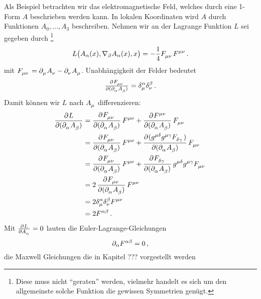 \begin{beispiel}
Als Beispiel betrachten wir das elektromagnetische Feld, welches durch eine
1-Form $A$ beschrieben werden kann. In lokalen Koordinaten wird $A$
durch Funktionen $A_0,\dots,A_3$ beschreiben. Nehmen wir an der Lagrange
Funktion $L$ sei gegeben durch \footnote{Diese muss nicht "`geraten"'
werden, vielmehr handelt es sich um den allgemeinste solche Funktion die
gewissen Symmetrien genügt. }
\begin{equation}
L\left(A_\alpha(x),\nabla_\beta
A_\alpha(x),x\right)=-\frac{1}{4}\tensor{F}{_\mu_\nu}\tensor{F}{^\mu^\nu}\,.
\end{equation}
mit
$\tensor{F}{_\mu_\nu}=\tensor{\partial}{_\mu}\tensor{A}{_\nu}-\tensor{\partial}{_\nu}\tensor{A}{_\mu}$.
Unabhängigkeit der Felder bedeutet
\begin{equation}
\pd{\tensor{F}{_\mu_\nu}}{(\tensor{\partial}{_\alpha}\tensor{A}{_\beta})}
=\tensor*{\delta}{^\alpha_\mu}\tensor*{\delta}{^\beta_\nu}\,.
\end{equation}
Damit können wir $L$ nach $\tensor{A}{_\mu}$ differenzieren:
\begin{equation}
\begin{split}
\dpd{L}{(\tensor{\partial}{_\alpha}\tensor{A}{_\beta})}
&=\dpd{\tensor{F}{_\mu_\nu}}{(\tensor{\partial}{_\alpha}\tensor{A}{_\beta})}\tensor{F}{^\mu^\nu}
+\dpd{\tensor{F}{^\mu^\nu}}{(\tensor{\partial}{_\alpha}\tensor{A}{_\beta})}\tensor{F}{_\mu_\nu}
\\
&=\dpd{\tensor{F}{_\mu_\nu}}{(\tensor{\partial}{_\alpha}\tensor{A}{_\beta})}\tensor{F}{^\mu^\nu}
+\dpd{(\tensor{g}{^\mu^\delta}\tensor{g}{^\mu^\gamma}\tensor{F}{_\delta_\gamma})}{(\tensor{\partial}{_\alpha}\tensor{A}{_\beta})}\tensor{F}{_\mu_\nu}
\\
&=\dpd{\tensor{F}{_\mu_\nu}}{(\tensor{\partial}{_\alpha}\tensor{A}{_\beta})}\tensor{F}{^\mu^\nu}
+\dpd{\tensor{F}{_\delta_\gamma}}{(\tensor{\partial}{_\alpha}\tensor{A}{_\beta})}\tensor{g}{^\mu^\delta}\tensor{g}{^\mu^\gamma}\tensor{F}{_\mu_\nu}
\\
&=2\dpd{\tensor{F}{_\mu_\nu}}{(\tensor{\partial}{_\alpha}\tensor{A}{_\beta})}\tensor{F}{^\mu^\nu}\\
&=2\tensor*{\delta}{^\alpha_\mu}\tensor*{\delta}{^\beta_\nu}\tensor{F}{^\mu^\nu}\\
&=2\tensor{F}{^\alpha^\beta}\,.
\end{split}
\end{equation}
Mit $\pd{L}{\tensor{A}{_\alpha}}=0$ lauten die Euler-Lagrange-Gleichungen
\begin{equation}
\partial_\alpha\tensor{F}{^\alpha^\beta}=0\,,
\end{equation}
die Maxwell Gleichungen die in Kapitel ??? vorgestellt werden
\end{beispiel}
